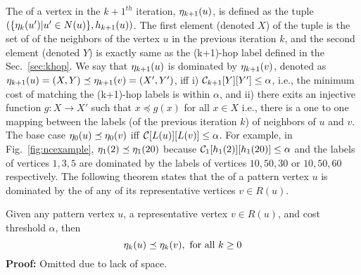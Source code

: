 The \ncl of a vertex in the ${k+1}^{th}$ iteration, $\eta_{k+1}(u)$, is
defined as the tuple $(\{\eta_{k}(u') | u' \in N(u)\},
h_{k+1}(u))$.  The first element (denoted $X$) of the tuple is the
set of \ncl of the neighbors of the vertex $u$ in the previous
iteration $k$, and the second element (denoted $Y$) is exactly same as
the (k+1)-hop label defined in the Sec.~\ref{sec:khop}. We say that
$\eta_{k+1}(u)$ is dominated by $\eta_{k+1}(v)$, denoted as
$\eta_{k+1}(u) = (X, Y) \preceq \eta_{k+1}(v) = (X', Y')$, iff 
i) $\mathcal{C}_{k+1}[Y][Y'] \leq \alpha$, i.e., the minimum cost of matching
the (k+1)-hop labels is within $\alpha$, and ii) there exits an injective
function $g\!\!:X\rightarrow X'$ such that $x \preceq g(x)$ for all $x
\in X$ i.e., there is a one to one mapping between the \ncl labels (of
the previous iteration $k$) of neighbors of $u$ and $v$.  The base case
$\eta_{0}(u) \preceq \eta_{0}(v)$ iff ${\mathcal{C}}[L(u)][L(v)] \leq
\alpha$. For example, in Fig.~\ref{fig:ncexample}, $\eta_{1}(2) \preceq
\eta_{1}(20)$ because $\mathcal{C}_{1}[h_{1}(2)][h_{1}(20)] \leq \alpha$ and the \ncl
labels of vertices $1, 3, 5$ are dominated by the \ncl labels of
vertices $10, 50, 30$ or $10, 50, 60$ respectively.  The following theorem states that
the \ncl of a pattern vertex $u$ is dominated by the \ncl of any of its
representative vertices $v \in  R(u)$.

\begin{thm} Given any pattern vertex $u$, a representative vertex $v \in
  R(u)$, and cost threshold $\alpha$, then
  $$\eta_{k}(u) \preceq \eta_{k}(v), \text{ for all } k \geq 0$$  
{\bf Proof:} Omitted due to lack of space.
	\label{thm:ncl} 
	\vspace{-0.05in}
\end{thm}

